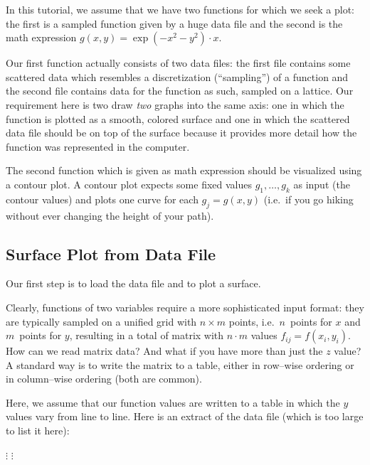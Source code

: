 
In this tutorial, we assume that we have two functions for which we seek a plot: the first is a sampled function given by a huge data file and the second is the math expression $g(x,y)=\exp(-x^2-y^2)\cdot x$. 

Our first function actually consists of two data files: the first file contains some scattered data which resembles a discretization (``sampling'') of a function and the second file contains data for the function as such, sampled on a lattice. 
Our requirement here is two draw \emph{two} graphs into the same axis: one in which the function is plotted as a smooth, colored surface and one in which the scattered data file should be on top of the surface because it provides more detail how the function was represented in the computer. 

The second function which is given as math expression should be visualized using a contour plot. A contour plot expects some fixed values $g_1, \dotsc, g_k$ as input (the contour values) and plots one curve for each $g_j = g(x,y)$ (i.e.\ if you go hiking without ever changing the height of your path). 


\subsection{Surface Plot from Data File}
Our first step is to load the data file and to plot a surface. 

Clearly, functions of two variables require a more sophisticated input format: they are typically sampled on a unified grid with $n \times m$ points, i.e.\ $n$~points for $x$ and $m$~points for $y$, resulting in a total of matrix with $n\cdot m$ values $f_{ij} = f(x_i,y_i)$. How can we read matrix data? And what if you have more than just the $z$ value? A standard way is to write the matrix to a table, either in row--wise ordering or in column--wise ordering (both are common). 

Here, we assume that our function values are written to a table in which the $y$ values vary from line to line. Here is an extract of the data file (which is too large to list it here):

    \baselineskip
    $\vdots$
    \baselineskip
    \baselineskip
    $\vdots$

